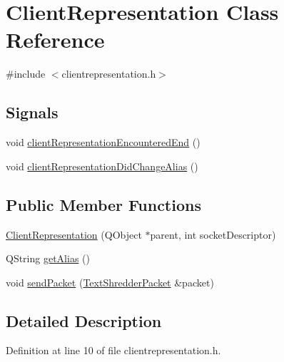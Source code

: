 \hypertarget{class_client_representation}{
\section{ClientRepresentation Class Reference}
\label{class_client_representation}
}


{\ttfamily \#include $<$clientrepresentation.h$>$}

\subsection*{Signals}
\begin{DoxyCompactItemize}
\item 
void \hyperlink{class_client_representation_a041de1d5874290e694e600128abf7b27}{clientRepresentationEncounteredEnd} ()
\item 
void \hyperlink{class_client_representation_a7f5b2f66c7684e54f88ee2dd89407349}{clientRepresentationDidChangeAlias} ()
\end{DoxyCompactItemize}
\subsection*{Public Member Functions}
\begin{DoxyCompactItemize}
\item 
\hyperlink{class_client_representation_a92ce01ecd9a2cc5e01eb73acce784893}{ClientRepresentation} (QObject $\ast$parent, int socketDescriptor)
\item 
QString \hyperlink{class_client_representation_a1d545edfbe90068bc188d776c0405df4}{getAlias} ()
\item 
void \hyperlink{class_client_representation_a093529d8890833cacb87df58c2a60af7}{sendPacket} (\hyperlink{class_text_shredder_packet}{TextShredderPacket} \&packet)
\end{DoxyCompactItemize}


\subsection{Detailed Description}


Definition at line 10 of file clientrepresentation.h.




